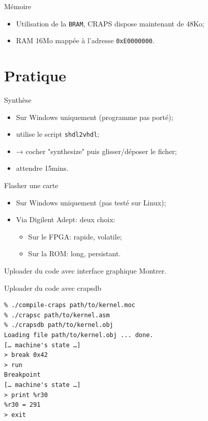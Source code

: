 \documentclass{beamer}
\begin{document}
    \begin{frame}[fragile]{Mémoire}
      \begin{itemize}
        \item Utilisation de la \verb+BRAM+, CRAPS dispose maintenant de 48Ko;
        \item RAM 16Mo mappée à l'adresse \verb+0xE0000000+.
      \end{itemize}
\end{frame}

  \section{Pratique}
    \begin{frame}[fragile]{Synthèse}
      \begin{itemize}
        \item Sur Windows uniquement (programme pas porté);
        \item utilise le script \verb+shdl2vhdl+;
        \item → cocher "synthesize" puis glisser/déposer le ficher;
        \item attendre 15mins.
      \end{itemize}
\end{frame}

    \begin{frame}{Flasher une carte}
      \begin{itemize}
        \item Sur Windows uniquement (pas testé sur Linux);
        \item Via Digilent Adept: deux choix:
          \begin{itemize}
            \item Sur le FPGA: rapide, volatile;
            \item Sur la ROM: long, persistant.
          \end{itemize}
      \end{itemize}
    \end{frame}

    \begin{frame}{Uploader du code avec interface graphique}
      Montrer.
    \end{frame}

    \begin{frame}[fragile]{Uploader du code avec crapsdb}
      \begin{verbatim}
% ./compile-craps path/to/kernel.moc
% ./crapsc path/to/kernel.asm
% ./crapsdb path/to/kernel.obj
Loading file path/to/kernel.obj ... done.
[… machine's state …]
> break 0x42
> run
Breakpoint
[… machine's state …]
> print %r30
%r30 = 291
> exit
      \end{verbatim}
\end{frame}
\end{document}
